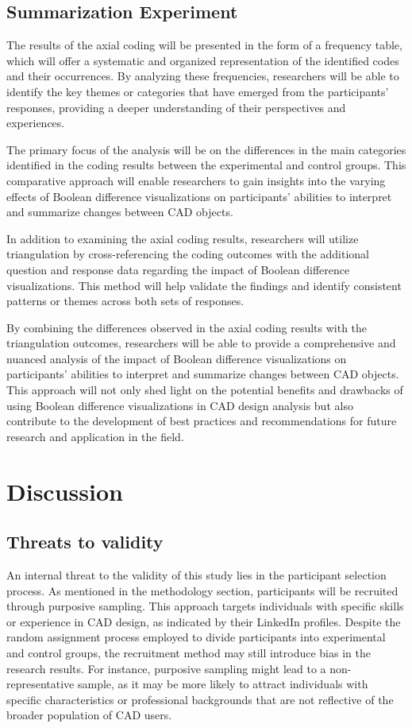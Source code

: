 \documentclass[sigconf,authorversion,nonacm]{acmart}
\begin{document}
\subsection{Summarization Experiment}

The results of the axial coding will be presented in the form of a frequency table, which will offer a systematic and organized representation of the identified codes and their occurrences.
By analyzing these frequencies, researchers will be able to identify the key themes or categories that have emerged from the participants' responses, providing a deeper understanding of their perspectives and experiences.

The primary focus of the analysis will be on the differences in the main categories identified in the coding results between the experimental and control groups.
This comparative approach will enable researchers to gain insights into the varying effects of Boolean difference visualizations on participants' abilities to interpret and summarize changes between CAD objects.

In addition to examining the axial coding results, researchers will utilize triangulation by cross-referencing the coding outcomes with the additional question and response data regarding the impact of Boolean difference visualizations.
This method will help validate the findings and identify consistent patterns or themes across both sets of responses.

By combining the differences observed in the axial coding results with the triangulation outcomes, researchers will be able to provide a comprehensive and nuanced analysis of the impact of Boolean difference visualizations on participants' abilities to interpret and summarize changes between CAD objects.
This approach will not only shed light on the potential benefits and drawbacks of using Boolean difference visualizations in CAD design analysis but also contribute to the development of best practices and recommendations for future research and application in the field.


\section{Discussion}


\subsection{Threats to validity}

An internal threat to the validity of this study lies in the participant selection process.
As mentioned in the methodology section, participants will be recruited through purposive sampling.
This approach targets individuals with specific skills or experience in CAD design, as indicated by their LinkedIn profiles.
Despite the random assignment process employed to divide participants into experimental and control groups, the recruitment method may still introduce bias in the research results.
For instance, purposive sampling might lead to a non-representative sample, as it may be more likely to attract individuals with specific characteristics or professional backgrounds that are not reflective of the broader population of CAD users.
\end{document}
